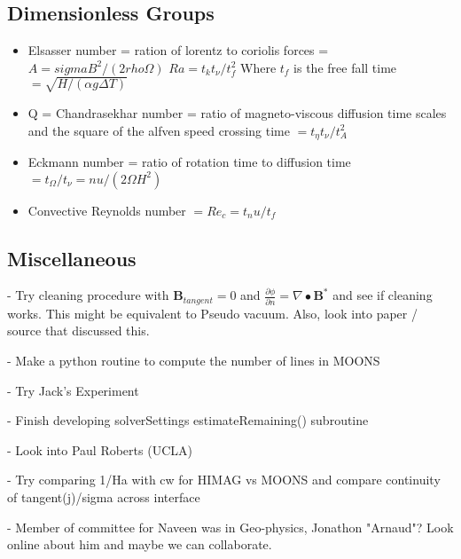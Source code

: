 \documentclass[11pt]{article}
\begin{document}
\subsection{Dimensionless Groups}
\begin{itemize}
\setlength\itemsep{-1em}
\item Elsasser number = ration of lorentz to coriolis forces = $A = sigma B^2 / (2 rho \Omega)$
$Ra = t_k t_{\nu} / t_f^2$ Where $t_f$ is the free fall time $ = \sqrt{ H/(\alpha g \Delta T)} $
\item Q = Chandrasekhar number = ratio of magneto-viscous diffusion time scales and the square of the alfven speed crossing time $ = t_{\eta} t_{\nu} / t_A^2$
\item Eckmann number = ratio of rotation time to diffusion time $ = t_{\Omega} / t_{\nu} = nu / (2 \Omega H^2)$
\item Convective Reynolds number $= Re_c = t_nu / t_f$
\end{itemize}


\subsection{Miscellaneous}

- Try cleaning procedure with $\mathbf{B}_{tangent}=0$ and $\frac{\partial \phi}{\partial n} = \nabla \bullet \mathbf{B}^*$ and see if cleaning works. This might be equivalent to Pseudo vacuum. Also, look into paper / source that discussed this.

- Make a python routine to compute the number of lines in MOONS

- Try Jack's Experiment

- Finish developing solverSettings estimateRemaining() subroutine

- Look into Paul Roberts (UCLA)

- Try comparing 1/Ha with cw for HIMAG vs MOONS and compare continuity of tangent(j)/sigma across interface

- Member of committee for Naveen was in Geo-physics, Jonathon "Arnaud"? Look online about him and maybe we can collaborate.

\newpage
\end{document}
